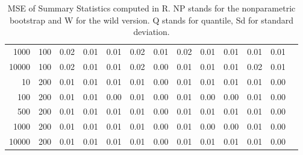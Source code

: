 \begin{table}[ht]
\begin{tabular}{rrrrrrrrrrrrr}
  1000 & 100 & 0.02 & 0.01 & 0.01 & 0.02 & 0.01 & 0.02 & 0.01 & 0.01 & 0.01 & 0.01 \\ 
10000 & 100 & 0.02 & 0.01 & 0.01 & 0.02 & 0.00 & 0.01 & 0.01 & 0.01 & 0.02 & 0.01 \\ 
10 & 200 & 0.01 & 0.01 & 0.01 & 0.01 & 0.00 & 0.01 & 0.01 & 0.01 & 0.01 & 0.00 \\ 
100 & 200 & 0.01 & 0.01 & 0.00 & 0.01 & 0.00 & 0.01 & 0.00 & 0.00 & 0.01 & 0.00 \\ 
500 & 200 & 0.01 & 0.01 & 0.01 & 0.01 & 0.00 & 0.01 & 0.01 & 0.01 & 0.01 & 0.00 \\ 
1000 & 200 & 0.01 & 0.01 & 0.01 & 0.01 & 0.00 & 0.01 & 0.00 & 0.00 & 0.01 & 0.00 \\ 
10000 & 200 & 0.01 & 0.01 & 0.01 & 0.01 & 0.00 & 0.01 & 0.01 & 0.01 & 0.01 & 0.00 \\ 
   \hline
\end{tabular}
\caption[MSE of Summary Statistics R]{MSE of Summary Statistics computed in R. NP stands for the nonparametric bootstrap and W for the wild version. Q stands for quantile, Sd for standard deviation.}
\label{tab:sum_mse_r}
\end{table}

